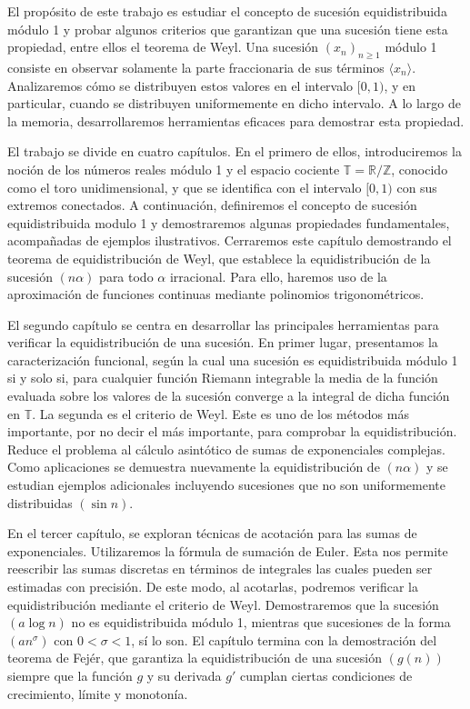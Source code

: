 El propósito de este trabajo es estudiar el concepto de sucesión equidistribuida módulo 1 y probar algunos criterios que garantizan que una sucesión tiene esta propiedad, entre ellos el teorema de Weyl. Una sucesión $(x_n)_{n\geq1}$ módulo 1 consiste en observar solamente la parte fraccionaria de sus términos $\langle x_n\rangle$. Analizaremos cómo se distribuyen estos valores en el intervalo $[0,1)$, y en particular, cuando se distribuyen uniformemente en dicho intervalo. A lo largo de la memoria, desarrollaremos herramientas eficaces para demostrar esta propiedad.

El trabajo se divide en cuatro capítulos. En el primero de ellos, introduciremos la noción de los números reales módulo 1 y el espacio cociente $\mathbb{T}=\mathbb{R}/\mathbb{Z}$, conocido como el toro unidimensional, y que se identifica con el intervalo $[0,1)$ con sus extremos conectados. A continuación, definiremos el concepto de sucesión equidistribuida modulo 1 y demostraremos algunas propiedades fundamentales, acompañadas de ejemplos ilustrativos. Cerraremos este capítulo demostrando el teorema de equidistribución de Weyl, que establece la equidistribución de la sucesión $(n\alpha)$ 
para todo $\alpha$ irracional. Para ello, haremos uso de la aproximación de funciones continuas mediante polinomios trigonométricos.

El segundo capítulo se centra en desarrollar las principales herramientas para verificar la equidistribución de una sucesión. En primer lugar, presentamos la caracterización funcional, según la cual una sucesión es equidistribuida módulo 1 si y solo si, para cualquier función Riemann integrable la media de la función evaluada sobre los valores de la sucesión converge a la integral de dicha función en $\mathbb{T}$.
La segunda  es el criterio de Weyl. Este es uno de los métodos más importante, por no decir el más importante, para comprobar la equidistribución. Reduce el problema al cálculo asintótico de sumas de exponenciales complejas. Como aplicaciones se demuestra nuevamente la equidistribución de $(n\alpha)$ y se estudian ejemplos adicionales incluyendo sucesiones que no son uniformemente distribuidas $(\sin n)$.


En el tercer capítulo, se exploran técnicas de acotación para las sumas de exponenciales. Utilizaremos la fórmula de sumación de Euler. Esta nos permite reescribir las sumas discretas en términos de integrales las cuales pueden ser estimadas con precisión. De este modo, al acotarlas, podremos verificar la equidistribución mediante el criterio de Weyl. Demostraremos que la sucesión $(a\log n)$ no es equidistribuida módulo 1, mientras que sucesiones de la forma $(an^\sigma)$ con $0<\sigma<1$, sí lo son. El capítulo termina con la demostración del teorema de Fejér, que garantiza la equidistribución de una sucesión $(g(n))$ siempre que la función $g$ y su derivada $g'$ cumplan ciertas condiciones de crecimiento, límite y monotonía.

